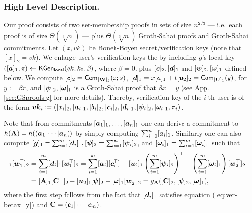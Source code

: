 \subsubsection{High Level Description.} %
%
Our proof consists of two set-membership proofs in sets of size $n^{2/3}$ --- i.e.~each proof is of size $\Theta(\sqrt[3]{n})$ ---  plus $\Theta(\sqrt[3]{n})$ Groth-Sahai proofs and Groth-Sahai commitments.
Let $(x,vk)$ be Boneh-Boyen secret/verification keys (note that $[x]_2=vk$).
We enlarge user's verification keys the by including $g$'s local key $([{\boldsymbol{a}}]_1, \pi)\gets \mathsf{KGen}_{\mathsf{local}}(gk,k_0,\beta)$, where $\beta=0$, plus $[{\boldsymbol{c}}]_2,[{\boldsymbol{d}}]_1$ and $[{\boldsymbol{\psi}}]_2,[{\boldsymbol{\omega}}]_1$ defined below. 
We compute $[{\boldsymbol{c}}]_2=\mathsf{Com}_{[\mathbf{{W}}]_2}(x;s)$, $[{\boldsymbol{d}}]_1 = x[{\boldsymbol{a}}]_1+t[{\boldsymbol{u}}_2]_2=\mathsf{Com}_{[\mathbf{{U}}]_1}(y)$, for $y:=\beta x$, and $[{\boldsymbol{\psi}}]_2,[{\boldsymbol{\omega}}]_1$ is a Groth-Sahai proof that $\beta x = y$ (see App. \ref{sec:GSproofs-g} for more details). Thereby, verification key of the $i$ th user is of the form ${\boldsymbol{vk}}_i:=([x_i]_2,[{\boldsymbol{a}}_i]_1,[{\boldsymbol{b}}_i]_2,[{\boldsymbol{c}}_i]_2,[{\boldsymbol{d}}_i]_1,[{\boldsymbol{\psi}}_i]_2,[{\boldsymbol{\omega}}_i]_1,\pi_i)$.

Note that from commitments $[{\boldsymbol{a}}_1]_1,\ldots,[{\boldsymbol{a}}_n]_1$ one can derive a commitment to $h(\mathbf{{A}})=h(({\boldsymbol{a}}_1|\cdots|{\boldsymbol{a}}_n))$ by simply computing $\sum_{i=0}^n [{\boldsymbol{a}}_i]_1$. Similarly one can also compute $[{\boldsymbol{g}}]_1 = \sum_{i=1}^m[{\boldsymbol{d}}_i]_1,[{\boldsymbol{\psi}}]_2 = \sum_{i=1}^m [{\boldsymbol{\psi}}_i]_2$, and $[{\boldsymbol{\omega}}_i]_1 = \sum_{i=1}^m [{\boldsymbol{\omega}}_i]_1$ such that
\begin{align*}
[\vecb{g}]_1[\vecb{w}_1^\top]_2 &= \sum_{i=1}^m [\vecb{d}_i]_1[\vecb{w}_1^\top]_2
= \sum_{i=1}^m [\vecb{a}_i][\vecb{c}_i^\top] - [\vecb{u}_2]_1\left(\sum_{i=1}^m[\vecb{\psi}_i]_2\right)^\top  -\left(\sum_{i=1}^m[\vecb{\omega}_i]_1\right)[\vecb{w}_2^\top]_2\\
&= [\matr{A}]_1[\matr{C}^\top]_2 - [\vecb{u}_2]_1[\vecb{\psi}]_2 - [\vecb{\omega}]_1[\vecb{w}_2^\top]_2
= g_{\matr{A}}([\matr{C}]_2,[\vecb{\psi}]_2,[\vecb{\omega}]_1),
\end{align*}
where the first step follows from the fact that $[{\boldsymbol{d}}_i]_1$ satisfies equation (\ref{eq:ver-betax=y}) and $\mathbf{{C}}=({\boldsymbol{c}}_1|\cdots|{\boldsymbol{c}}_m)$. %

